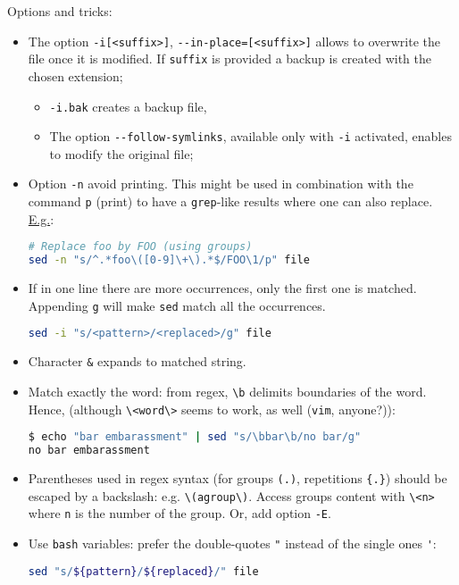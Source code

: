 \documentclass[a4paper,12pt,%
              final%
              ]{article}
\begin{document}
Options and tricks:
\begin{itemize}
  \item The option \verb|-i[<suffix>]|, \verb|--in-place=[<suffix>]| allows to overwrite the file once it is modified. If \verb|suffix| is provided a backup is created with the chosen extension;
    \begin{itemize}
      \item \verb|-i.bak| creates a backup file,
      \item The option \verb|--follow-symlinks|, available only with \verb|-i| activated, enables to modify the original file;
    \end{itemize}
  \item Option \verb|-n| avoid printing. This might be used in combination with the command \texttt{p} (print) to have a \texttt{grep}-like results where one can also replace. \href{https://unix.stackexchange.com/a/278377}{E.g.}:
\begin{lstlisting}[language=bash]
# Replace foo by FOO (using groups)
sed -n "s/^.*foo\([0-9]\+\).*$/FOO\1/p" file
\end{lstlisting}
  \item If in one line there are more occurrences, only the first one is matched. Appending \texttt{g} will make \texttt{sed} match all the occurrences.
\begin{lstlisting}[language=bash]
sed -i "s/<pattern>/<replaced>/g" file
\end{lstlisting}
  \item Character \verb|&| expands to matched string.
  \item Match exactly the word: from regex, \verb|\b| delimits boundaries of the word. Hence, (although \verb|\<word\>| seems to work, as well (\texttt{vim}, anyone?)):
\begin{lstlisting}[language=bash]
$ echo "bar embarassment" | sed "s/\bbar\b/no bar/g"
no bar embarassment
\end{lstlisting}
  \item Parentheses used in regex syntax (for groups \verb|(.)|, repetitions \verb|{.}|) should be escaped by a backslash: e.g. \verb|\(agroup\)|. Access groups content with \verb|\<n>| where \verb|n| is the number of the group. Or, add option \verb|-E|.
  \item Use \texttt{bash} variables: prefer the double-quotes \verb|"| instead of the single ones \verb|'|:
\begin{lstlisting}[language=bash]
sed "s/${pattern}/${replaced}/" file
\end{lstlisting}

\end{itemize}
\end{document}

